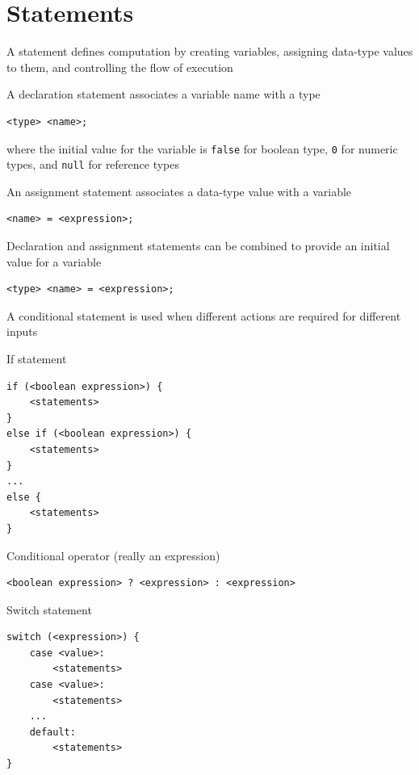 \documentclass[8pt,a4paper,compress]{beamer}
\begin{document}
\section{Statements}
\begin{frame}[fragile]
\pause

A statement defines computation by creating variables, assigning data-type values to them, and controlling the flow of execution

\pause
\bigskip

A declaration statement associates a variable name with a type
\begin{lstlisting}[language={}]
<type> <name>;
\end{lstlisting}
where the initial value for the variable is \lstinline{false} for boolean type, \lstinline{0} for numeric types, and \lstinline{null} for reference types

\pause
\bigskip

An assignment statement associates a data-type value with a variable
\begin{lstlisting}[language={}]
<name> = <expression>;
\end{lstlisting}

\pause
\bigskip

Declaration and assignment statements can be combined to provide an initial value for a variable
\begin{lstlisting}[language={}]
<type> <name> = <expression>;
\end{lstlisting}
\end{frame}

\begin{frame}[fragile]
\pause

A conditional statement is used when different actions are required for different inputs

\pause
\bigskip

If statement
\begin{lstlisting}[language={}]
if (<boolean expression>) {
    <statements>
}
else if (<boolean expression>) {
    <statements>
}
...
else {
    <statements>
}
\end{lstlisting}

\pause
\bigskip

Conditional operator (really an expression)
\begin{lstlisting}[language={}]
<boolean expression> ? <expression> : <expression>
\end{lstlisting}

\pause
\bigskip

Switch statement
\begin{lstlisting}[language={}]
switch (<expression>) {
    case <value>:
        <statements>
    case <value>:
        <statements>
    ...
    default:
        <statements>
}
\end{lstlisting}
\end{frame}
\end{document}
